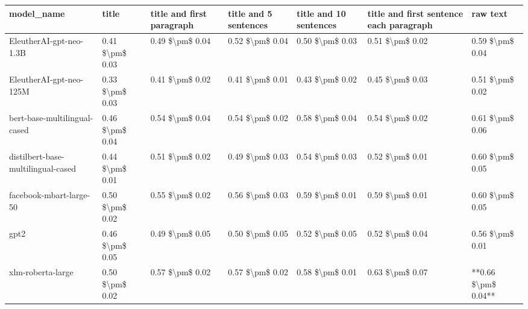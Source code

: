 \begin{tabular}{lllllll}
\toprule
                        model\_name &           title & title and first paragraph & title and 5 sentences & title and 10 sentences & title and first sentence each paragraph &            raw text \\
\midrule
           EleutherAI-gpt-neo-1.3B & 0.41 \$\textbackslash pm\$ 0.03 &           0.49 \$\textbackslash pm\$ 0.04 &       0.52 \$\textbackslash pm\$ 0.04 &        0.50 \$\textbackslash pm\$ 0.03 &                         0.51 \$\textbackslash pm\$ 0.02 &     0.59 \$\textbackslash pm\$ 0.04 \\
           EleutherAI-gpt-neo-125M & 0.33 \$\textbackslash pm\$ 0.03 &           0.41 \$\textbackslash pm\$ 0.02 &       0.41 \$\textbackslash pm\$ 0.01 &        0.43 \$\textbackslash pm\$ 0.02 &                         0.45 \$\textbackslash pm\$ 0.03 &     0.51 \$\textbackslash pm\$ 0.02 \\
      bert-base-multilingual-cased & 0.46 \$\textbackslash pm\$ 0.04 &           0.54 \$\textbackslash pm\$ 0.04 &       0.54 \$\textbackslash pm\$ 0.02 &        0.58 \$\textbackslash pm\$ 0.04 &                         0.54 \$\textbackslash pm\$ 0.02 &     0.61 \$\textbackslash pm\$ 0.06 \\
distilbert-base-multilingual-cased & 0.44 \$\textbackslash pm\$ 0.01 &           0.51 \$\textbackslash pm\$ 0.02 &       0.49 \$\textbackslash pm\$ 0.03 &        0.54 \$\textbackslash pm\$ 0.03 &                         0.52 \$\textbackslash pm\$ 0.01 &     0.60 \$\textbackslash pm\$ 0.05 \\
           facebook-mbart-large-50 & 0.50 \$\textbackslash pm\$ 0.02 &           0.55 \$\textbackslash pm\$ 0.02 &       0.56 \$\textbackslash pm\$ 0.03 &        0.59 \$\textbackslash pm\$ 0.01 &                         0.59 \$\textbackslash pm\$ 0.01 &     0.60 \$\textbackslash pm\$ 0.05 \\
                              gpt2 & 0.46 \$\textbackslash pm\$ 0.05 &           0.49 \$\textbackslash pm\$ 0.05 &       0.50 \$\textbackslash pm\$ 0.05 &        0.52 \$\textbackslash pm\$ 0.05 &                         0.52 \$\textbackslash pm\$ 0.04 &     0.56 \$\textbackslash pm\$ 0.01 \\
                 xlm-roberta-large & 0.50 \$\textbackslash pm\$ 0.02 &           0.57 \$\textbackslash pm\$ 0.02 &       0.57 \$\textbackslash pm\$ 0.02 &        0.58 \$\textbackslash pm\$ 0.01 &                         0.63 \$\textbackslash pm\$ 0.07 & **0.66 \$\textbackslash pm\$ 0.04** \\
\bottomrule
\end{tabular}
